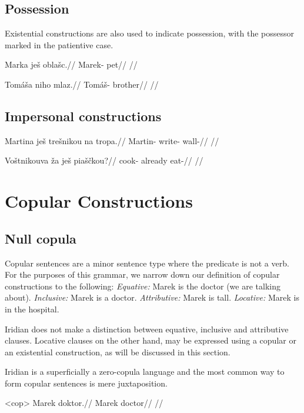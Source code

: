 \subsection{Possession}
Existential constructions are also used to indicate possession, with the possessor marked in the patientive case.

\pex
\begingl
\gla Marka ješ oblašc.//
\glb Marek-\Pat{} \Exst{} pet//
\glft {}//
\endgl
\xe

\pex
\begingl
\gla Tomáša niho mlaz.//
\glb Tomáš-\Pat{} \Exst{} brother//
\glft {}//
\endgl
\xe

\subsection{Impersonal constructions}
\pex
\begingl
\gla Martina ješ trešnikou na tropa.//
\glb Martin-\Pat{} \Exst{} write- \Loc{} wall-\Pat{}//
\glft {}//
\endgl
\xe

\pex
\begingl
\gla Voštnikouva \v{z}a ješ piaščkou?//
\glb cook- already \Exst{} eat-//
\glft {}//
\endgl
\xe

\section{Copular Constructions}
\subsection{Null copula}

Copular sentences are a minor sentence type where the predicate is not a verb. For the purposes of this grammar, we narrow down our definition of copular constructions to the following:
\pex
\a \textit{Equative:} Marek is the doctor (we are talking about).
\a \textit{Inclusive:} Marek is a doctor.
\a \textit{Attributive:} Marek is tall.
\a \textit{Locative:} Marek is in the hospital.
\xe

Iridian does not make a distinction between equative, inclusive and attributive clauses. Locative clauses on the other hand, may be expressed using a copular or an existential construction, as will be discussed in this section.

Iridian is a superficially a zero-copula language and the most common way to form copular sentences is mere juxtaposition.

\pex<cop>
\begingl
\gla Marek doktor.//
\glb Marek doctor//
\glft {}//
\endgl
\xe

